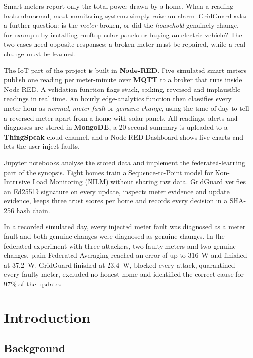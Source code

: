 \documentclass[12pt,a4paper,oneside]{report}
\begin{document}
Smart meters report only the total power drawn by a home. When a reading looks abnormal, most monitoring systems simply raise an alarm. GridGuard asks a further question: is the \emph{meter} broken, or did the \emph{household} genuinely change, for example by installing rooftop solar panels or buying an electric vehicle? The two cases need opposite responses: a broken meter must be repaired, while a real change must be learned.

The IoT part of the project is built in \textbf{Node-RED}. Five simulated smart meters publish one reading per meter-minute over \textbf{MQTT} to a broker that runs inside Node-RED. A validation function flags stuck, spiking, reversed and implausible readings in real time. An hourly edge-analytics function then classifies every meter-hour as \emph{normal}, \emph{meter fault} or \emph{genuine change}, using the time of day to tell a reversed meter apart from a home with solar panels. All readings, alerts and diagnoses are stored in \textbf{MongoDB}, a 20-second summary is uploaded to a \textbf{ThingSpeak} cloud channel, and a Node-RED Dashboard shows live charts and lets the user inject faults.

Jupyter notebooks analyse the stored data and implement the federated-learning part of the synopsis. Eight homes train a Sequence-to-Point model for Non-Intrusive Load Monitoring (NILM) without sharing raw data. GridGuard verifies an Ed25519 signature on every update, inspects meter evidence and update evidence, keeps three trust scores per home and records every decision in a SHA-256 hash chain.

In a recorded simulated day, every injected meter fault was diagnosed as a meter fault and both genuine changes were diagnosed as genuine changes. In the federated experiment with three attackers, two faulty meters and two genuine changes, plain Federated Averaging reached an error of up to 316~W and finished at 37.2~W. GridGuard finished at 23.4~W, blocked every attack, quarantined every faulty meter, excluded no honest home and identified the correct cause for 97\% of the updates.

\tableofcontents
\listoffigures
\listoftables

\clearpage
{}

\chapter{Introduction}

\section{Background}
\end{document}

